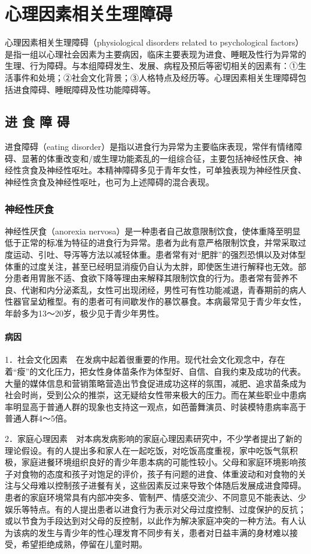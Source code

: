 \chapter{心理因素相关生理障碍}

心理因素相关生理障碍（physiological disorders related to psychological
factors）是指一组以心理社会因素为主要病因，临床主要表现为进食、睡眠及性行为异常的生理、行为障碍。与本组障碍发生、发展、病程及预后等密切相关的因素有：①生活事件和处境；②社会文化背景；③人格特点及经历等。心理因素相关生理障碍包括进食障碍、睡眠障碍及性功能障碍等。

\section{进 食 障 碍}

进食障碍（eating
disorder）是指以进食行为异常为主要临床表现，常伴有情绪障碍、显著的体重改变和/或生理功能紊乱的一组综合征，主要包括神经性厌食、神经性贪食及神经性呕吐。本精神障碍多见于青年女性，可单独表现为神经性厌食、神经性贪食及神经性呕吐，也可为上述障碍的混合表现。

\subsection{神经性厌食}

神经性厌食（anorexia
nervosa）是一种患者自己故意限制饮食，使体重降至明显低于正常的标准为特征的进食行为异常。患者为此有意严格限制饮食，并常采取过度运动、引吐、导泻等方法以减轻体重。患者常有对“肥胖”的强烈恐惧以及对体型体重的过度关注，甚至已经明显消瘦仍自认为太胖，即使医生进行解释也无效。部分患者用胃胀不适、食欲下降等理由来解释其限制饮食的行为。患者常有营养不良、代谢和内分泌紊乱，女性可出现闭经，男性可有性功能减退，青春期前的病人性器官呈幼稚型。有的患者可有间歇发作的暴饮暴食。本病最常见于青少年女性，年龄多为13～20岁，极少见于青少年男性。

\subsubsection{病因}

1．社会文化因素　在发病中起着很重要的作用。现代社会文化观念中，存在着“瘦”的文化压力，把女性身体苗条作为体型好、自信、自我约束及成功的代表。大量的媒体信息和营销策略营造出节食促进成功这样的氛围，减肥、追求苗条成为社会时尚，受到公众的推崇，这无疑给女性带来极大的压力。而在某些职业中患病率明显高于普通人群的现象也支持这一观点，如芭蕾舞演员、时装模特患病率高于普通人群4～5倍。

2．家庭心理因素　对本病发病影响的家庭心理因素研究中，不少学者提出了新的理论假设。有的人提出多和家人在一起吃饭，对吃饭高度重视，家中吃饭气氛积极，家庭进餐环境组织良好的青少年患本病的可能性较小。父母和家庭环境影响孩子对食物的态度和孩子对饱足的评价，孩子有问题的进食、体重波动和对食物的关注与父母难以控制孩子进餐有关，这些因素反过来导致个体随后发展成进食障碍。患者的家庭环境常具有内部冲突多、管制严、情感交流少、不同意见不能表达、少娱乐等特点。有的人提出患者以进食行为表示对父母过度控制、过度保护的反抗；或以节食为手段达到对父母的反控制，以此作为解决家庭冲突的一种方法。有人认为该病的发生与青少年的性心理发育不同步有关，患者对日益丰满的身材难以接受，希望拒绝成熟，停留在儿童时期。

